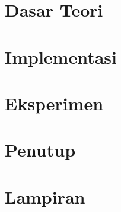 \documentclass[12pt,a4paper]{report}
\begin{document}
\chapter{Dasar Teori}


\chapter{Implementasi}


\chapter{Eksperimen}


\chapter{Penutup}


\chapter{Lampiran}

\end{document}
